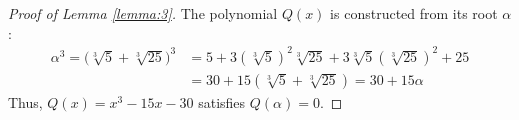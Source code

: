 \begin{proof}[Proof of Lemma \ref{lemma:3}]
The polynomial $Q(x)$ is constructed from its root $\alpha$:
\begin{align*}
\alpha^{3} 
= \bigl(\sqrt[3]{5}+\sqrt[3]{25}\bigr)^{3}
& = 5 + 3(\sqrt[3]{5})^{2}\sqrt[3]{25} + 3\sqrt[3]{5}(\sqrt[3]{25})^{2} + 25
\\
& = 30 + 15(\sqrt[3]{5}+\sqrt[3]{25})
= 30 + 15\alpha
\end{align*}
Thus, $Q(x)=x^{3}-15x-30$ satisfies $Q(\alpha)=0$.
\end{proof}
